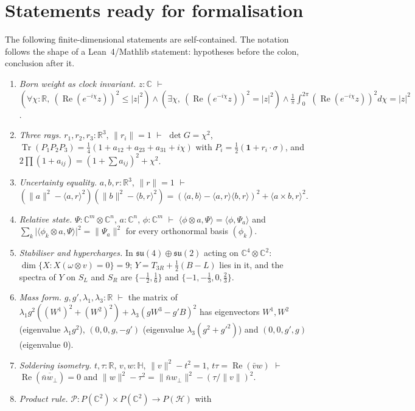 \documentclass[aps,pra,onecolumn,superscriptaddress,nofootinbib,10pt]{revtex4-2}
\theoremstyle{definition}
\theoremstyle{remark}
\newcommand{\R}{\mathbb{R}}
\newcommand{\C}{\mathbb{C}}
\newcommand{\HH}{\mathbb{H}}
\newcommand{\re}{\operatorname{Re}}
\newcommand{\tr}{\operatorname{Tr}}
\newcommand{\ip}[2]{\langle #1,#2\rangle}
\begin{document}
\section{Statements ready for formalisation}\label{app:formal}
The following finite-dimensional statements are self-contained.  The notation follows the shape of a
Lean~4/Mathlib statement: hypotheses before the colon, conclusion after it.
\begin{enumerate}[label=(F\arabic*),leftmargin=2.6em]
\item \emph{Born weight as clock invariant.}  $z:\C$ $\vdash$
$(\forall\chi:\R,\ (\re(e^{-i\chi}z))^2\le\lvert z\rvert^2)\wedge(\exists\chi,\ (\re(e^{-i\chi}z))^2=\lvert z\rvert^2)
\wedge\frac1\pi\int_0^{2\pi}(\re(e^{-i\chi}z))^2d\chi=\lvert z\rvert^2$.
\item \emph{Three rays.}  $r_1,r_2,r_3:\R^3$, $\lVert r_i\rVert=1$ $\vdash$ $\det G=\chi^2$,
$\tr(P_1P_2P_3)=\frac14(1+a_{12}+a_{23}+a_{31}+i\chi)$ with $P_i=\frac12(\mathbf1+r_i\cdot\sigma)$, and
$2\prod(1+a_{ij})=(1+\sum a_{ij})^2+\chi^2$.
\item \emph{Uncertainty equality.}  $a,b,r:\R^3$, $\lVert r\rVert=1$ $\vdash$
$(\lVert a\rVert^2-\ip ar^2)(\lVert b\rVert^2-\ip br^2)=(\ip ab-\ip ar\ip br)^2+\ip{a\times b}{r}^2$.
\item \emph{Relative state.}  $\Psi:\C^m\otimes\C^n$, $a:\C^n$, $\phi:\C^m$ $\vdash$
$\ip{\phi\otimes a}{\Psi}=\ip{\phi}{\Psi_a}$ and $\sum_k\lvert\ip{\phi_k\otimes a}{\Psi}\rvert^2=\lVert\Psi_a\rVert^2$ for every
orthonormal basis $(\phi_k)$.
\item \emph{Stabiliser and hypercharges.}  In $\mathfrak{su}(4)\oplus\mathfrak{su}(2)$ acting on $\C^4\otimes\C^2$:
$\dim\{X:X(\omega\otimes v)=0\}=9$; $Y=T_{3R}+\frac12(B-L)$ lies in it, and the spectra of $Y$ on $S_L$ and
$S_R$ are $\{-\frac12,\frac16\}$ and $\{-1,-\frac13,0,\frac23\}$.
\item \emph{Mass form.}  $g,g',\lambda_1,\lambda_3:\R$ $\vdash$ the matrix of
$\lambda_1g^2((W^1)^2+(W^2)^2)+\lambda_3(gW^3-g'B)^2$ has eigenvectors $W^1,W^2$ (eigenvalue $\lambda_1g^2$),
$(0,0,g,-g')$ (eigenvalue $\lambda_3(g^2+g'^2)$) and $(0,0,g',g)$ (eigenvalue $0$).
\item \emph{Soldering isometry.}  $t,\tau:\R$, $v,w:\HH$, $\lVert v\rVert^2-t^2=1$, $t\tau=\re(\bar vw)$ $\vdash$
$\re(\overline{\bar nw_\perp})=0$ and $\lVert w\rVert^2-\tau^2=\lVert\bar nw_\perp\rVert^2-(\tau/\lVert v\rVert)^2$.
\item \emph{Product rule.}  $\mathcal P:P(\C^2)\times P(\C^2)\to P(\mathcal H)$ with

\end{enumerate}
\end{document}
